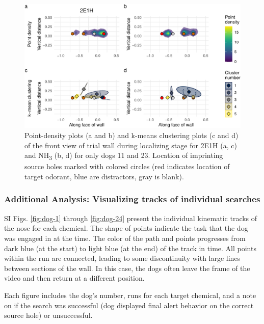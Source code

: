 \documentclass[
]{article}
\begin{document}
\begin{figure}
\centering
\includegraphics{supplementary-info_files/figure-latex/frontwall-detailing-11-23-1.pdf}
\caption{\label{fig:frontwall-detailing-11-23}Point-density plots (a and b) and k-means clustering plots (c and d) of the front view of trial wall during localizing stage for 2E1H (a, c) and NH\textsubscript{3} (b, d) for only dogs 11 and 23. Location of imprinting source holes marked with colored circles (red indicates location of target odorant, blue are distractors, gray is blank).}
\end{figure}

\newpage

\hypertarget{additional-analysis-visualizing-tracks-of-individual-searches}{%
\subsubsection{Additional Analysis: Visualizing tracks of individual searches}\label{additional-analysis-visualizing-tracks-of-individual-searches}}

SI Figs. \ref{fig:dog-1} through \ref{fig:dog-24} present the individual kinematic tracks of the nose for each chemical. The shape of points indicate the task that the dog was engaged in at the time. The color of the path and points progresses from dark blue (at the start) to light blue (at the end) of the track in time. All points within the run are connected, leading to some discontinuity with large lines between sections of the wall. In this case, the dogs often leave the frame of the video and then return at a different position.

Each figure includes the dog's number, runs for each target chemical, and a note on if the search was successful (dog displayed final alert behavior on the correct source hole) or unsuccessful.
\end{document}
